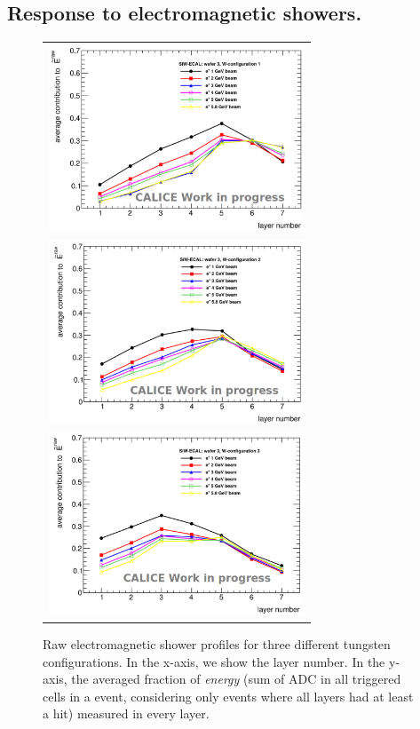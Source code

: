 \documentclass[journal]{IEEEtran}
\begin{document}
\subsection{Response to electromagnetic showers.}

\begin{figure}[!t]
  \centering
  \begin{tabular}{l}
    \includegraphics[width=3.0in]{shower1-eps-converted-to.pdf}\\
    \includegraphics[width=3.0in]{shower2-eps-converted-to.pdf}\\
    \includegraphics[width=3.0in]{shower3-eps-converted-to.pdf}
  \end{tabular}
\caption{Raw electromagnetic shower profiles for three different tungsten configurations. In the x-axis, we show the layer number. In the y-axis, the averaged fraction of {\it energy} (sum of ADC in all triggered cells in a event, considering only events where all layers had at least a hit) measured in every layer. }
\label{showers}
\end{figure}
\end{document}
